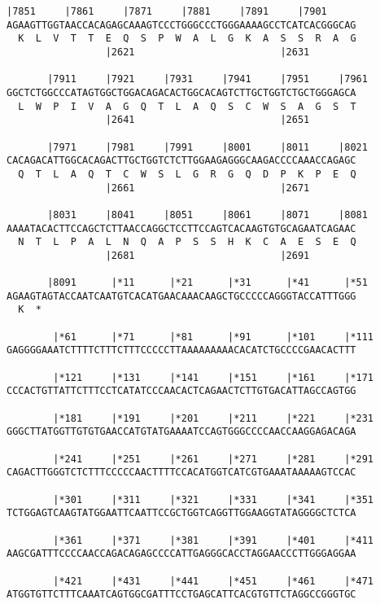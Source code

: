 \documentclass{article}
\begin{document}
\newpage
\begin{Verbatim}[fontfamily=courier]
       |7851     |7861     |7871     |7881     |7891     |7901
AGAAGTTGGTAACCACAGAGCAAAGTCCCTGGGCCCTGGGAAAAGCCTCATCACGGGCAG
  K  L  V  T  T  E  Q  S  P  W  A  L  G  K  A  S  S  R  A  G
                 |2621                         |2631        

       |7911     |7921     |7931     |7941     |7951     |7961
GGCTCTGGCCCATAGTGGCTGGACAGACACTGGCACAGTCTTGCTGGTCTGCTGGGAGCA
  L  W  P  I  V  A  G  Q  T  L  A  Q  S  C  W  S  A  G  S  T
                 |2641                         |2651        

       |7971     |7981     |7991     |8001     |8011     |8021
CACAGACATTGGCACAGACTTGCTGGTCTCTTGGAAGAGGGCAAGACCCCAAACCAGAGC
  Q  T  L  A  Q  T  C  W  S  L  G  R  G  Q  D  P  K  P  E  Q
                 |2661                         |2671        

       |8031     |8041     |8051     |8061     |8071     |8081
AAAATACACTTCCAGCTCTTAACCAGGCTCCTTCCAGTCACAAGTGTGCAGAATCAGAAC
  N  T  L  P  A  L  N  Q  A  P  S  S  H  K  C  A  E  S  E  Q
                 |2681                         |2691        

       |8091      |*11      |*21      |*31      |*41      |*51
AGAAGTAGTACCAATCAATGTCACATGAACAAACAAGCTGCCCCCAGGGTACCATTTGGG
  K  *   

        |*61      |*71      |*81      |*91      |*101     |*111
GAGGGGAAATCTTTTCTTTCTTTCCCCCTTAAAAAAAAACACATCTGCCCCGAACACTTT

        |*121     |*131     |*141     |*151     |*161     |*171
CCCACTGTTATTCTTTCCTCATATCCCAACACTCAGAACTCTTGTGACATTAGCCAGTGG

        |*181     |*191     |*201     |*211     |*221     |*231
GGGCTTATGGTTGTGTGAACCATGTATGAAAATCCAGTGGGCCCCAACCAAGGAGACAGA

        |*241     |*251     |*261     |*271     |*281     |*291
CAGACTTGGGTCTCTTTCCCCCAACTTTTCCACATGGTCATCGTGAAATAAAAAGTCCAC

        |*301     |*311     |*321     |*331     |*341     |*351
TCTGGAGTCAAGTATGGAATTCAATTCCGCTGGTCAGGTTGGAAGGTATAGGGGCTCTCA

        |*361     |*371     |*381     |*391     |*401     |*411
AAGCGATTTCCCCAACCAGACAGAGCCCCATTGAGGGCACCTAGGAACCCTTGGGAGGAA

        |*421     |*431     |*441     |*451     |*461     |*471
ATGGTGTTCTTTCAAATCAGTGGCGATTTCCTGAGCATTCACGTGTTCTAGGCCGGGTGC

\end{Verbatim}
\end{document}
